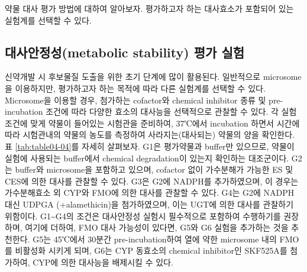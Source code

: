 \documentclass[
  11pt,
  krantz2, a4paper, twoside]{krantz}
\begin{document}
약물 대사 평가 방법에 대하여 알아보자. 평가하고자 하는 대사효소가
포함되어 있는 실험계를 선택할 수 있다.

\hypertarget{uxb300uxc0acuxc548uxc815uxc131metabolic-stability-uxd3c9uxac00-uxc2e4uxd5d8}{%
\subsection{대사안정성(metabolic stability) 평가 실험}\label{uxb300uxc0acuxc548uxc815uxc131metabolic-stability-uxd3c9uxac00-uxc2e4uxd5d8}}

신약개발 시 후보물질 도출을 위한 초기 단계에 많이 활용된다. 일반적으로
microsome을 이용하지만, 평가하고자 하는 목적에 따라 다른 실험계를 선택할
수 있다. Microsome을 이용할 경우, 첨가하는 cofactor와 chemical inhibitor
종류 및 pre-incubation 조건에 따라 다양한 효소의 대사능을 선택적으로
관찰할 수 있다. 각 실험 조건에 맞게 약물이 들어있는 시험관을 준비하여,
37℃에서 incubation 하면서 시간에 따라 시험관내의 약물의 농도를 측정하여
사라지는(대사되는) 약물의 양을 확인한다. 표 \ref{tab:table04-04}를 자세히
살펴보자. G1은 평가약물과 buffer만 있으므로, 약물이 실험에 사용되는
buffer에서 chemical degradation이 있는지 확인하는 대조군이다. G2는
buffer와 microsome을 포함하고 있으며, cofactor 없이 가수분해가 가능한 ES
및 CES에 의한 대사를 관찰할 수 있다. G3은 G2에 NADPH를 추가하였으며, 이
경우는 가수분해효소 외 CYP와 FMO에 의한 대사를 관찰할 수 있다. G4는 G2에
NADPH 대신 UDPGA (+alamethicin)을 첨가하였으며, 이는 UGT에 의한 대사를
관찰하기 위함이다. G1\textasciitilde G4의 조건은 대사안정성 실험시 필수적으로 포함하여
수행하기를 권장하며, 여기에 더하여, FMO 대사 가능성이 있다면, G5와 G6
실험을 추가하는 것을 추천한다. G5는 45℃에서 30분간 pre-incubation하여
열에 약한 microsome 내의 FMO를 비활성화 시키게 되며, G6는 CYP 동효소의
chemical inhibitor인 SKF525A를 첨가하여, CYP에 의한 대사능을 배제시킬 수
있다.
\end{document}
